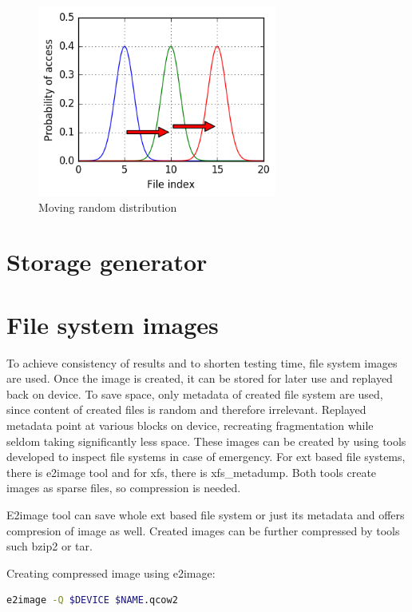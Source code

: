 \documentclass[
  color, %
  table, %
  lof,   %
  lot,   %
]{fithesis3}
\begin{document}
\begin{figure}
    \begin{minipage}{\textwidth}
        \centering
        \includegraphics[width=0.7\textwidth]{../scripts/fig3.png}
        \caption{Moving random distribution}
\label{fig:rand3}
    \end{minipage}
\end{figure}

\section{Storage generator}
\section{File system images}
To achieve consistency of results and to shorten testing time, file system images are used. Once the image is created, it can be stored for later use and replayed back on device. To save space, only metadata of created file system are used, since content of created files is random and therefore irrelevant. Replayed metadata point at various blocks on device, recreating fragmentation while seldom taking significantly less space. These images can be created by using tools developed to inspect file systems in case of emergency. For ext based file systems, there is e2image tool and for xfs, there is xfs\_metadump. Both tools create images as sparse files, so compression is needed.

E2image tool can save whole ext based file system or just its metadata and offers compresion of image as well. Created images can be further compressed by tools such bzip2 or tar.

\noindent Creating compressed image using e2image:
\begin{lstlisting}[language=bash]
  e2image -Q $DEVICE $NAME.qcow2
\end{lstlisting}
\end{document}
